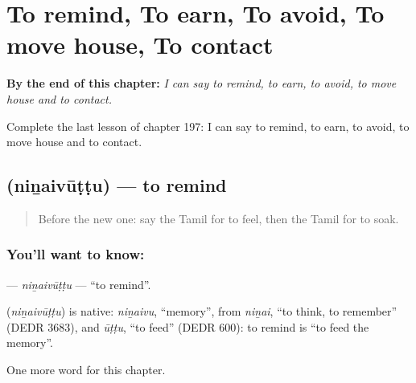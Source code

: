 
\chapter{To remind, To earn, To avoid, To move house, To contact}
\label{ch:ta-to-remind-to-earn-to-avoid-to-move-house-to-contact}

\begin{chapteropening}
\textbf{By the end of this chapter:} \emph{I can say to remind, to earn, to avoid, to move house and to contact.}

Complete the last lesson of chapter 197: I can say to remind, to earn, to avoid, to move house and to contact.
\end{chapteropening}

\section[\texorpdfstring{\ta{நினைவூட்டு} (niṉaivūṭṭu)}{நினைவூட்டு (niṉaivūṭṭu)}]{ (niṉaivūṭṭu) — to remind}

\label{lesson:TA-C197-ninaivuttu}



\begin{quote}
Before the new one: say the Tamil for to feel, then the Tamil for to soak.
\end{quote}

\subsection*{You'll want to know: }
\textbf{} — \emph{niṉaivūṭṭu} — \textquotedblleft{}to remind\textquotedblright{}.

\begin{cousinweb}
\textbf{} (\emph{niṉaivūṭṭu}) is native: \emph{niṉaivu}, \textquotedblleft{}memory\textquotedblright{}, from \emph{niṉai}, \textquotedblleft{}to think, to remember\textquotedblright{} (DEDR 3683), and \emph{ūṭṭu}, \textquotedblleft{}to feed\textquotedblright{} (DEDR 600): to remind is \textquotedblleft{}to feed the memory\textquotedblright{}.
\end{cousinweb}

\begin{grammarlens}[title={What you've built}]
One more word for this chapter.
\end{grammarlens}

